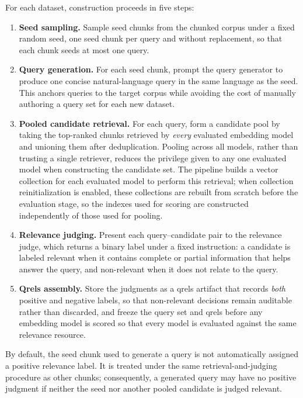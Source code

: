 For each dataset, construction proceeds in five steps:
\begin{enumerate}
\tightlist
\item \textbf{Seed sampling.} Sample seed chunks from the chunked corpus under a fixed random seed, one seed chunk per query and without replacement, so that each chunk seeds at most one query.
\item \textbf{Query generation.} For each seed chunk, prompt the query generator to produce one concise natural-language query in the same language as the seed. This anchors queries to the target corpus while avoiding the cost of manually authoring a query set for each new dataset.
\item \textbf{Pooled candidate retrieval.} For each query, form a candidate pool by taking the top-ranked chunks retrieved by \emph{every} evaluated embedding model and unioning them after deduplication. Pooling across all models, rather than trusting a single retriever, reduces the privilege given to any one evaluated model when constructing the candidate set. The pipeline builds a vector collection for each evaluated model to perform this retrieval; when collection reinitialization is enabled, these collections are rebuilt from scratch before the evaluation stage, so the indexes used for scoring are constructed independently of those used for pooling.
\item \textbf{Relevance judging.} Present each query--candidate pair to the relevance judge, which returns a binary label under a fixed instruction: a candidate is labeled relevant when it contains complete or partial information that helps answer the query, and non-relevant when it does not relate to the query.
\item \textbf{Qrels assembly.} Store the judgments as a qrels artifact that records \emph{both} positive and negative labels, so that non-relevant decisions remain auditable rather than discarded, and freeze the query set and qrels before any embedding model is scored so that every model is evaluated against the same relevance resource.
\end{enumerate}

By default, the seed chunk used to generate a query is not automatically assigned a positive relevance label. It is treated under the same retrieval-and-judging procedure as other chunks; consequently, a generated query may have no positive judgment if neither the seed nor another pooled candidate is judged relevant.

